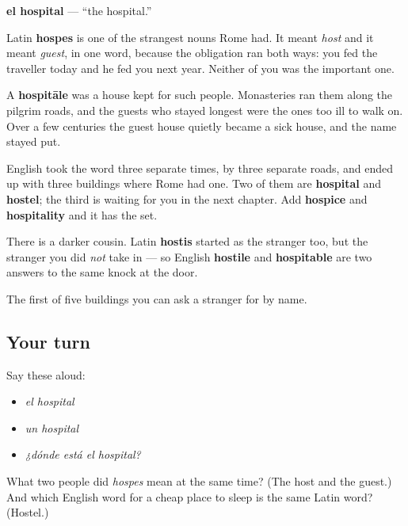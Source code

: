 \begin{cousinweb}
\textbf{el hospital} — \textquotedblleft{}the hospital.\textquotedblright{}

Latin \textbf{hospes} is one of the strangest nouns Rome had. It meant \emph{host} and it meant \emph{guest}, in one word, because the obligation ran both ways: you fed the traveller today and he fed you next year. Neither of you was the important one.

A \textbf{hospitāle} was a house kept for such people. Monasteries ran them along the pilgrim roads, and the guests who stayed longest were the ones too ill to walk on. Over a few centuries the guest house quietly became a sick house, and the name stayed put.

English took the word three separate times, by three separate roads, and ended up with three buildings where Rome had one. Two of them are \textbf{hospital} and \textbf{hostel}; the third is waiting for you in the next chapter. Add \textbf{hospice} and \textbf{hospitality} and it has the set.

There is a darker cousin. Latin \textbf{hostis} started as the stranger too, but the stranger you did \emph{not} take in — so English \textbf{hostile} and \textbf{hospitable} are two answers to the same knock at the door.
\end{cousinweb}

\begin{grammarlens}[title={What you've built}]
The first of five buildings you can ask a stranger for by name.
\end{grammarlens}

\subsection*{Your turn}
Say these aloud:

\begin{itemize}
\raggedright
  \item \emph{el hospital}
  \item \emph{un hospital}
  \item \emph{¿dónde está el hospital?}
\end{itemize}

\begin{tcolorbox}[breakable,colback=teal!4,colframe=teal!35!black,title={Before you move on}]
What two people did \emph{hospes} mean at the same time? (The host and the guest.) And which English word for a cheap place to sleep is the same Latin word? (Hostel.)
\end{tcolorbox}
